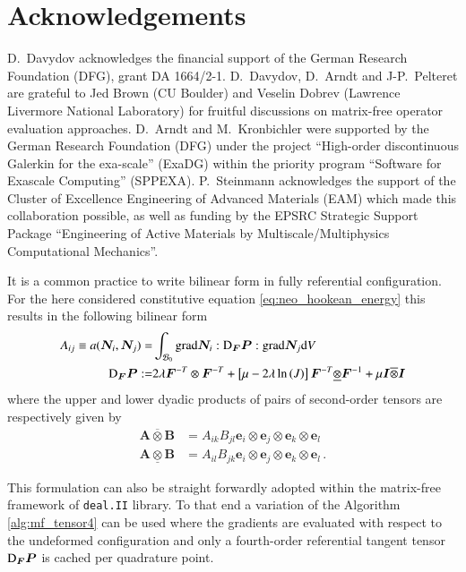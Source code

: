 \documentclass[AMA,STIX1COL]{WileyNJD-v2}
\newcommand*{\gz}[1]{\boldsymbol{#1}}
\newcommand*{\grad}{\mathrm{grad}}
\renewcommand*{\d}{\mathrm{d}}
\newcommand*{\mcl}[1]{\mathcal{#1}}
\begin{document}
\section*{Acknowledgements}

D.~Davydov acknowledges the financial support of the German Research Foundation (DFG), grant DA 1664/2-1.
D.~Davydov, D.~Arndt and J-P.~Pelteret are grateful to Jed Brown (CU Boulder) and Veselin Dobrev (Lawrence Livermore National Laboratory) for fruitful discussions on matrix-free operator evaluation approaches.
D.~Arndt and M.~Kronbichler were supported by the German Research Foundation (DFG) under the project ``High-order discontinuous
Galerkin for the exa-scale'' (\mbox{ExaDG}) within the priority program ``Software
for Exascale Computing'' (SPPEXA).
P.~Steinmann acknowledges the support of the Cluster of Excellence Engineering of Advanced Materials (EAM) which made this collaboration possible, as well as funding by the EPSRC Strategic Support Package ``Engineering of Active Materials by Multiscale/Multiphysics Computational Mechanics''.

\appendix

{\color{red}
It is a common practice to write bilinear form in fully referential configuration. For the here considered constitutive equation \eqref{eq:neo_hookean_energy} this results in the following bilinear form
}
\begin{align}
  A_{ij} \equiv a(\gz N_i, \gz N_j) =&
  \int_{\mcl B_0}
  \grad \gz N_i : {\rm D}_{\gz F}{\gz P} : \grad \gz N_j
  \d V
  \label{eq:algebraic_tangent_dPdF}
  \\
  {\rm D}_{\gz F}{\gz P} :=&
  2 \lambda
  \gz F^{-T} \otimes \gz F^{-T}
  +
  \left[\mu - 2 \lambda \ln\left( J \right) \right]
  \gz F^{-T} \underline{\otimes} \gz F^{-1}
  +
  \mu \gz I \overline{\otimes} \gz I
\end{align}
where the upper and lower dyadic products of pairs of second-order tensors are respectively given by
\begin{align*}
    \gz A \overline{\otimes} \gz B &= A_{ik} B_{jl} \gz e_i \otimes \gz e_j \otimes \gz e_k \otimes \gz e_l \\
    \gz A \underline{\otimes} \gz B &= A_{il} B_{jk} \gz e_i \otimes \gz e_j \otimes \gz e_k \otimes \gz e_l  \, .
\end{align*}

{\color{red}
This formulation can also be straight forwardly adopted within the matrix-free framework of \texttt{deal.II} library.
To that end a variation of the Algorithm \ref{alg:mf_tensor4} can be used where the gradients are evaluated with respect to the undeformed configuration and only a fourth-order referential tangent tensor ${\rm D}_{\gz F}{\gz P}$ is cached per quadrature point.
}
\end{document}
